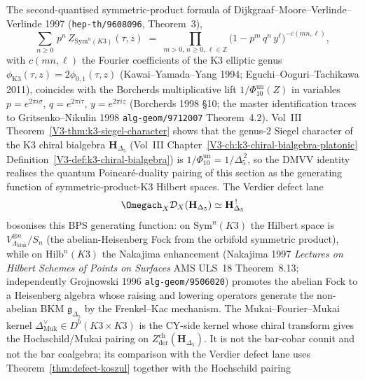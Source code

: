 \begin{remark}
\label{rem:pdq-witten-dmvv-nakajima}
%
%
%
%
The second-quantised symmetric-product formula of
Dijkgraaf--Moore--Verlinde--Verlinde 1997
(\texttt{hep-th/9608096}, Theorem~3),
\[
 \sum_{n \geq 0}\,p^{n}\,Z_{\mathrm{Sym}^{n}(K3)}(\tau, z)
 \;=\;
 \prod_{m > 0,\, n \geq 0,\, \ell \in \mathbb{Z}}
 \bigl(1 - p^{m}\,q^{n}\,y^{\ell}\bigr)^{-c(mn, \ell)},
\]
with $c(m n, \ell)$ the Fourier coefficients of the K3 elliptic genus
$\phi_{\mathrm{K3}}(\tau, z) = 2\phi_{0,1}(\tau, z)$ (Kawai--Yamada--Yang
1994; Eguchi--Ooguri--Tachikawa 2011), coincides with the Borcherds
multiplicative lift $1/\Phi_{10}^{\mathrm{un}}(Z)$ in variables
$p = e^{2\pi i \sigma}$, $q = e^{2\pi i \tau}$, $y = e^{2\pi i z}$
(Borcherds 1998 \S10; the master identification traces to
Gritsenko--Nikulin 1998 \texttt{alg-geom/9712007} Theorem~4.2). Vol~III
Theorem~\ref{V3-thm:k3-siegel-character} shows that the genus-$2$ Siegel
character of the K3 chiral bialgebra
$\mathbf{H}_{\Delta_{5}}$
(Vol~III Chapter~\ref{V3-ch:k3-chiral-bialgebra-platonic}
Definition~\ref{V3-def:k3-chiral-bialgebra}) is $1/\Phi_{10}^{\mathrm{un}} =
1/\Delta_{5}^{\,2}$, so the DMVV identity realises the quantum
Poincar\'e-duality pairing of this section as the generating function
of symmetric-product-K3 Hilbert spaces. The Verdier defect lane
\[
\Omegach_X\mathcal{D}_X(\mathbf{H}_{\Delta_{5}})
\simeq
\mathbf{H}_{\Delta_{5}}^{\,!}
\]
bosonises this BPS generating function:
on $\mathrm{Sym}^{n}(K3)$ the Hilbert space is
$V_{\Lambda_{\mathrm{Muk}}}^{\otimes n}/S_{n}$
(the abelian-Heisenberg Fock from the orbifold symmetric product), while
on $\mathrm{Hilb}^{n}(K3)$ the Nakajima enhancement (Nakajima 1997
\emph{Lectures on Hilbert Schemes of Points on Surfaces} AMS ULS~18
Theorem~8.13; independently Grojnowski 1996
\texttt{alg-geom/9506020}) promotes the abelian Fock to a Heisenberg
algebra whose raising and lowering operators generate the non-abelian
BKM $\mathfrak{g}_{\Delta_{5}}$ by the Frenkel--Kac mechanism. The
Mukai--Fourier--Mukai kernel
$\Delta^{\vee}_{\mathrm{Muk}} \in D^{b}(K3 \times K3)$ is the
CY-side kernel whose chiral transform gives the Hochschild/Mukai
pairing on $Z_{\mathrm{der}}^{\mathrm{ch}}(\mathbf{H}_{\Delta_{5}})$.
It is not the bar-cobar counit and not the bar coalgebra; its
comparison with the Verdier defect lane uses
Theorem~\ref{thm:defect-koszul} together with the Hochschild pairing

\end{remark}
